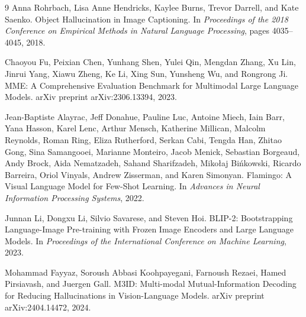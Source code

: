 {\begin{thebibliography}{9}
Anna Rohrbach, Lisa Anne Hendricks, Kaylee Burns, Trevor Darrell, and Kate Saenko.
\newblock Object Hallucination in Image Captioning.
\newblock In \textit{Proceedings of the 2018 Conference on Empirical Methods in Natural Language Processing}, pages 4035--4045, 2018.

Chaoyou Fu, Peixian Chen, Yunhang Shen, Yulei Qin, Mengdan Zhang, Xu Lin, Jinrui Yang, Xiawu Zheng, Ke Li, Xing Sun, Yunsheng Wu, and Rongrong Ji.
\newblock MME: A Comprehensive Evaluation Benchmark for Multimodal Large Language Models.
\newblock arXiv preprint arXiv:2306.13394, 2023.


Jean-Baptiste Alayrac, Jeff Donahue, Pauline Luc, Antoine Miech, Iain Barr, Yana Hasson, Karel Lenc, Arthur Mensch, Katherine Millican, Malcolm Reynolds, Roman Ring, Eliza Rutherford, Serkan Cabi, Tengda Han, Zhitao Gong, Sina Samangooei, Marianne Monteiro, Jacob Menick, Sebastian Borgeaud, Andy Brock, Aida Nematzadeh, Sahand Sharifzadeh, Miko\l{}aj Bi\'nkowski, Ricardo Barreira, Oriol Vinyals, Andrew Zisserman, and Karen Simonyan.
\newblock Flamingo: A Visual Language Model for Few-Shot Learning.
\newblock In \textit{Advances in Neural Information Processing Systems}, 2022.

Junnan Li, Dongxu Li, Silvio Savarese, and Steven Hoi.
\newblock BLIP-2: Bootstrapping Language-Image Pre-training with Frozen Image Encoders and Large Language Models.
\newblock In \textit{Proceedings of the International Conference on Machine Learning}, 2023.

Mohammad Fayyaz, Soroush Abbasi Koohpayegani, Farnoush Rezaei, Hamed Pirsiavash, and Juergen Gall.
\newblock M3ID: Multi-modal Mutual-Information Decoding for Reducing Hallucinations in Vision-Language Models.
\newblock arXiv preprint arXiv:2404.14472, 2024.

\end{thebibliography}
}